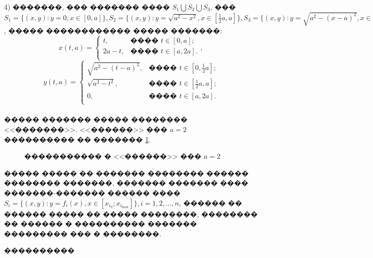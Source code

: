 \documentclass[a4paper]{article}
\begin{document}
  4) �������, ��� ������� ���� $S_1 \bigcup S_2 \bigcup S_3$, ��� $S_1=\{(x,y): y=0, x \in [0, a]\},S_2=\{(x,y): y=\sqrt{a^2-x^2}, x \in [\frac{1}{2}a, a]\},S_3=\{(x,y): y=\sqrt{a^2-(x-a)^2}, x \in [0,\frac{1}{2} a]\}$, ����� ������������ ����� �������:
        \[
          x(t,a) =
          \begin{cases}
            t,    & \text{���� $t \in [0,a]$;}  \\
            2a-t, & \text{���� $t \in [a,2a]$.} \\
          \end{cases},
        \]
        \[y(t,a) =
          \begin{cases}
            \sqrt{a^2-(t-a)^2}, & \text{���� $t \in [0,\frac{1}{2}a]$;} \\
            \sqrt{a^2-t^2},     & \text{���� $t \in [\frac{1}{2}a,a]$;} \\
            0,                  & \text{���� $t \in [a,2a]$.}           \\
          \end{cases}
        \]
        \\
        ����� ������� ����� �������� <<�������>>. <<������>> ��� $a=2$ ���������� �� ������� \ref{tros}.

        \begin{figure}[h!]
          \noindent{}
          \caption{����������� � <<������>> ��� $a=2$}
          \label{tros}
        \end{figure}

����� ����� �� ������� �������� ������ �������� �������, ������� ������� ���� �������-������� ������ ���� $S_i=\{(x,y): y=f_i(x), x \in [x_{i_0};x_{i_{\max}}]\}, i=1,2,\dots, n$, ������ �� ������ ����� �� ����� ��������, �������� �� ������ � ���������� ������� ��������� ��� � ��������.

\FloatBarrier
����������
\end{document}
